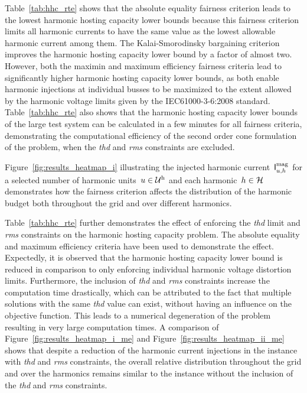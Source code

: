 \noindent Table~\ref{tab:hhc_rte} shows that the absolute equality fairness criterion leads to the lowest harmonic hosting capacity lower bounds because this fairness criterion limits all harmonic currents to have the same value as the lowest allowable harmonic current among them. The Kalai-Smorodinsky bargaining criterion improves the harmonic hosting capacity lower bound by a factor of almost two. However, both the maximin and maximum efficiency fairness criteria lead to significantly higher harmonic hosting capacity lower bounds, as both enable harmonic injections at individual busses to be maximized to the extent allowed by the harmonic voltage limits given by the IEC61000-3-6:2008 standard.  Table~\ref{tab:hhc_rte} also shows that the harmonic hosting capacity lower bounds of the large test system can be calculated in a few minutes for all fairness criteria, demonstrating the computational efficiency of the second order cone formulation of the problem, when the \emph{thd} and \emph{rms} constraints are excluded.

Figure~\ref{fig:results_heatmap_i} illustrating the injected harmonic current~$\mathsf{I}^{\text{mag}}_{u,h}$ for a selected number of harmonic units~$u \in \mathcal{U}^{\text{h}}$ and each harmonic~$h \in \mathcal{H}$  demonstrates how the fairness criterion affects the distribution of the harmonic budget both throughout the grid and over different harmonics.

Table~\ref{tab:hhc_rte} further demonstrates the effect of enforcing the \emph{thd} limit and \emph{rms} constraints on the harmonic hosting capacity problem. The absolute equality and maximum efficiency criteria have been used to demonstrate the effect. Expectedly, it is observed that the harmonic hosting capacity lower bound is reduced in comparison to only enforcing individual harmonic voltage distortion limits. Furthermore, the inclusion of \emph{thd} and \emph{rms} constraints increase the computation time drastically, which can be attributed to the fact that multiple solutions with the same \emph{thd} value can exist, without having an influence on the objective function. This leads to a numerical degeneration of the problem resulting in very large computation times. A comparison of Figure~\ref{fig:results_heatmap_i_me} and Figure~\ref{fig:results_heatmap_ii_me} shows that despite a reduction of the harmonic current injections in the instance with \emph{thd} and \emph{rms} constraints, the overall relative distribution throughout the grid and over the harmonics remains similar to the instance without the inclusion of the \emph{thd} and \emph{rms} constraints.

